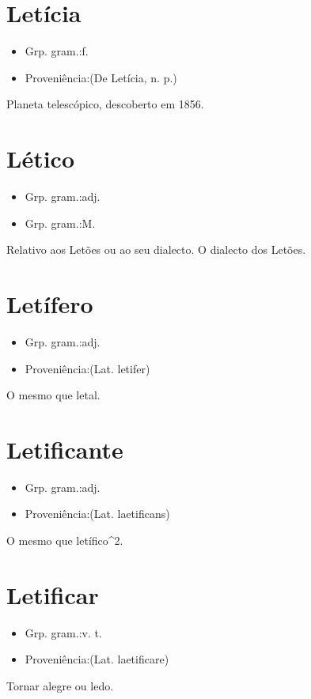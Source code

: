 \section{Letícia}
\begin{itemize}
\item {Grp. gram.:f.}
\end{itemize}
\begin{itemize}
\item {Proveniência:(De \textunderscore Letícia\textunderscore , n. p.)}
\end{itemize}
Planeta telescópico, descoberto em 1856.
\section{Lético}
\begin{itemize}
\item {Grp. gram.:adj.}
\end{itemize}
\begin{itemize}
\item {Grp. gram.:M.}
\end{itemize}
Relativo aos Letões ou ao seu dialecto.
O dialecto dos Letões.
\section{Letífero}
\begin{itemize}
\item {Grp. gram.:adj.}
\end{itemize}
\begin{itemize}
\item {Proveniência:(Lat. \textunderscore letifer\textunderscore )}
\end{itemize}
O mesmo que \textunderscore letal\textunderscore .
\section{Letificante}
\begin{itemize}
\item {Grp. gram.:adj.}
\end{itemize}
\begin{itemize}
\item {Proveniência:(Lat. \textunderscore laetificans\textunderscore )}
\end{itemize}
O mesmo que \textunderscore letífico\textunderscore ^2.
\section{Letificar}
\begin{itemize}
\item {Grp. gram.:v. t.}
\end{itemize}
\begin{itemize}
\item {Proveniência:(Lat. \textunderscore laetificare\textunderscore )}
\end{itemize}
Tornar alegre ou ledo.
